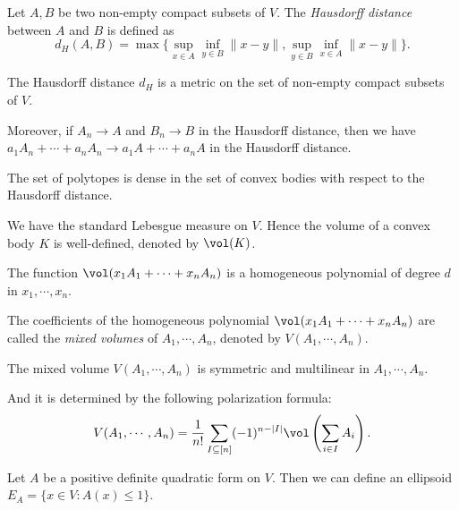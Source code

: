   \begin{definition}
    Let $A, B$ be two non-empty compact subsets of $V$.
    The \emph{Hausdorff distance} between $A$ and $B$ is defined as
    \[d_H(A, B) = \max\{\sup_{x \in A} \inf_{y \in B} \|x - y\|, \sup_{y \in B} \inf_{x \in A} \|x - y\|\}.\]
   \Yang{}
    
  \end{definition}

  \begin{proposition}
    The Hausdorff distance $d_H$ is a metric on the set of non-empty compact subsets of $V$.

    Moreover, if $A_n \to A$ and $B_n \to B$ in the Hausdorff distance, then we have $a_1 A_n + \cdots + a_n A_n \to a_1 A + \cdots + a_n A$ in the Hausdorff distance.
   \Yang{}
  \end{proposition}

  \begin{proposition}
    The set of polytopes is dense in the set of convex bodies with respect to the Hausdorff distance.
   \Yang{}
  \end{proposition}

  We have the standard Lebesgue measure on $V$.
  Hence the volume of a convex body $K$ is well-defined, denoted by $\vol(K)$.

  \begin{theorem}
    The function $\vol(x_1 A_1 + \cdots + x_n A_n)$ is a homogeneous polynomial of degree $d$ in $x_1, \cdots, x_n$.
  \end{theorem}

  \begin{definition}
    The coefficients of the homogeneous polynomial $\vol(x_1 A_1 + \cdots + x_n A_n)$ are called the \emph{mixed volumes} of $A_1, \cdots, A_n$, denoted by $V(A_1, \cdots, A_n)$.
  \end{definition}

  \begin{proposition}
    The mixed volume $V(A_1, \cdots, A_n)$ is symmetric and multilinear in $A_1, \cdots, A_n$.

    And it is determined by the following polarization formula:
    \[V(A_1, \cdots, A_n) = \frac{1}{n!} \sum_{I \subseteq [n]} (-1)^{n - |I|} \vol\left(\sum_{i \in I} A_i\right).\]
   \Yang{}
   
  \end{proposition}

  \begin{example}[Ellipsoid]
    Let $A$ be a positive definite quadratic form on $V$.
    Then we can define an ellipsoid $E_A = \{x \in V : A(x) \leq 1\}$.
   \Yang{}
    
  \end{example}



